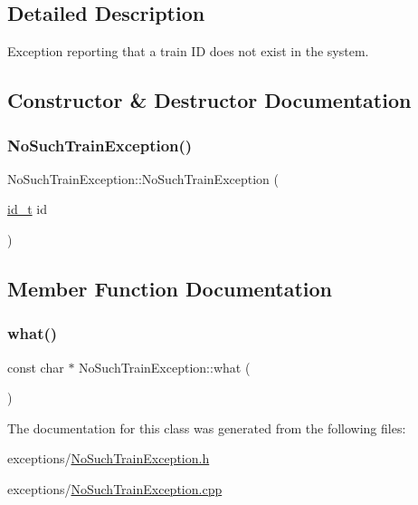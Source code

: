 \subsection{Detailed Description}
Exception reporting that a train ID does not exist in the system. 

\subsection{Constructor \& Destructor Documentation}
\mbox{\label{classNoSuchTrainException_ae60439498bd6e552159ed1c50335daba}} 
\subsubsection{\texorpdfstring{No\+Such\+Train\+Exception()}{NoSuchTrainException()}}
{\footnotesize\ttfamily No\+Such\+Train\+Exception\+::\+No\+Such\+Train\+Exception (\begin{DoxyParamCaption}\item[{\mbox{\hyperlink{project__utils_8h_a8f3a969054ad2200720b96e7e23dd4e1}{id\+\_\+t}}}]{id }\end{DoxyParamCaption})}



\subsection{Member Function Documentation}
\mbox{\label{classNoSuchTrainException_ad2739cfe2389af42ee3f6780ff1392c5}} 
\subsubsection{\texorpdfstring{what()}{what()}}
{\footnotesize\ttfamily const char $\ast$ No\+Such\+Train\+Exception\+::what (\begin{DoxyParamCaption}{ }\end{DoxyParamCaption})}



The documentation for this class was generated from the following files\+:\begin{DoxyCompactItemize}
\item 
exceptions/\mbox{\hyperlink{NoSuchTrainException_8h}{No\+Such\+Train\+Exception.\+h}}\item 
exceptions/\mbox{\hyperlink{NoSuchTrainException_8cpp}{No\+Such\+Train\+Exception.\+cpp}}\end{DoxyCompactItemize}
